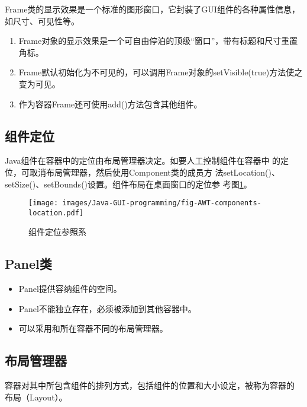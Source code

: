 Frame类的显示效果是一个标准的图形窗口，它封装了GUI组件的各种属性信息，如尺寸、可见性等。

\begin{enumerate}\kai
\item Frame对象的显示效果是一个可自由停泊的顶级“窗口”，带有标题和尺寸重置角标。
\item Frame默认初始化为不可见的，可以调用Frame对象的setVisible(true)方法使之变为可见。
\item 作为容器Frame还可使用add()方法包含其他组件。
\end{enumerate}


\subsection{组件定位}

Java组件在容器中的定位由{\hei 布局管理器}决定。如要人工控制组件在容器中
的定位，可取消布局管理器，然后使用Component类的成员方
法setLocation()、setSize()、setBounds()设置。组件布局在桌面窗口的定位参
考图\ref{fig:fig-AWT-components-location}。

\begin{figure}[htb]
\centering
\texttt{[image: images/Java-GUI-programming/fig-AWT-components-location.pdf]}
\caption{组件定位参照系}
\label{fig:fig-AWT-components-location}
\end{figure}

\subsection{Panel类}

\begin{itemize}
\item Panel提供容纳组件的空间。
\item Panel不能独立存在，必须被添加到其他容器中。
\item 可以采用和所在容器不同的布局管理器。
\end{itemize}


\subsection{布局管理器}

容器对其中所包含组件的排列方式，包括组件的位置和大小设定，被称为容器的
布局（Layout）。

